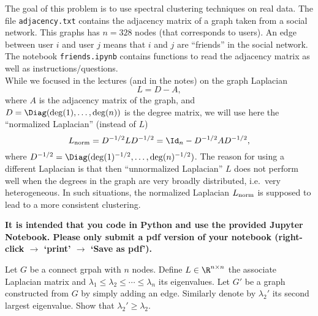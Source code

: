 \documentclass[11pt,nocut]{article}
\begin{document}
\begin{problem}[4 points]
	The goal of this problem is to use spectral clustering techniques on real data.
	The file \texttt{adjacency.txt} contains the adjacency matrix of a graph taken from a social network. This graphs has $n=328$ nodes (that corresponds to users). An edge between user $i$ and user $j$ means that $i$ and $j$ are ``friends'' in the social network.
	The notebook \texttt{friends.ipynb} contains functions to read the adjacency matrix as well as instructions/questions.
	\\

	While we focused in the lectures (and in the notes) on the graph Laplacian
	$$
	L = D - A,
	$$
	where $A$ is the adjacency matrix of the graph, and $D = \Diag(\deg(1), \dots, \deg(n))$ is the degree matrix, we will use here the ``normalized Laplacian'' (instead of $L$)
	$$
	L_{\rm norm} = D^{-1/2} L D^{-1/2} = \Id_n - D^{-1/2} A D^{-1/2},
	$$
	where $D^{-1/2} = \Diag(\deg(1)^{-1/2}, \dots, \deg(n)^{-1/2})$. The reason for using a different Laplacian is that then ``unnormalized Laplacian'' $L$ does not perform well when the degrees in the graph are very broadly distributed, i.e.\ very heterogeneous. In such situations, the normalized Laplacian $L_{\rm norm}$ is supposed to lead to a more consistent clustering.

	\textbf{It is intended that you code in Python and use the provided Jupyter Notebook. Please only submit a pdf version of your notebook (right-click $\to$ `print' $\to$ `Save as pdf').}
\end{problem}

\vspace{5mm}

\begin{problem}[$\star$]
	Let $G$ be a connect grpah with $n$ nodes. Define $L \in \R^{n \times n}$ the associate Laplacian matrix and $\lambda_1 \leq \lambda_2 \leq \cdots \leq \lambda_n$ its eigenvalues. Let $G'$ be a graph constructed from $G$ by simply adding an edge. Similarly denote by $\lambda_2'$ its second largest eigenvalue. Show that  $\lambda_2' \geq \lambda_2$. 
\end{problem}


%
%
\end{document}
